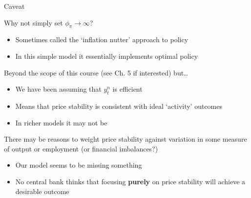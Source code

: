 
	
\begin{frame}{Caveat}

Why not simply set $\phi_{\pi} \to \infty$?
\begin{itemize}
\item	Sometimes called the `inflation nutter' approach to policy
\item	In this simple model it essentially implements optimal policy
\end{itemize}

\vspace{2mm}
Beyond the scope of this course (see Ch. 5 if interested) but\ldots
\begin{itemize}
\item	We have been assuming that $y^{n}_{t}$ is efficient
\item	Means that price stability is consistent with ideal `activity' outcomes
\item	In richer models it may not be 
\end{itemize}

\vspace{2mm}
There may be reasons to weight price stability against variation in some measure of output or employment (or financial imbalances?)
\begin{itemize}
\item	Our model seems to be missing something
\item	No central bank thinks that focusing \textbf{purely} on price stability will achieve a desirable outcome
\end{itemize}

\end{frame}




